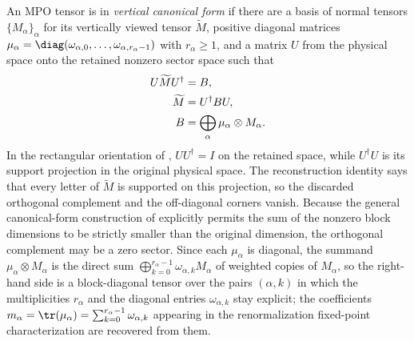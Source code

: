 \begin{definition}\label{def:vertical_cf_mpdo}
    \leanok
    An MPO tensor is in \emph{vertical canonical form} if there are a basis of
    normal tensors $\{M_\alpha\}_\alpha$ for its vertically viewed tensor
    $\widetilde M$, positive diagonal matrices
    $\mu_\alpha=\diag(\omega_{\alpha,0},\ldots,\omega_{\alpha,r_\alpha-1})$
    with $r_\alpha\geq1$,
    and a matrix $U$ from the physical space onto the retained nonzero sector
    space such that
    \begin{align}
        U\widetilde MU^\dagger
         & =B,
        \notag                                           \\
        \widetilde M
         & =U^\dagger B U,
        \notag                                           \\
        B
         & =\bigoplus_\alpha \mu_\alpha\otimes M_\alpha.
        \label{eq:mpdo_vertical_cf}
    \end{align}
    In the rectangular orientation of
    \cite[Proposition~4.13, lines~1863--1870]{Cirac2016MPDO_arXiv},
    $UU^\dagger=I$ on the retained space, while
    $U^\dagger U$ is its support projection in the original physical space.
    The reconstruction identity says that every letter of $\widetilde M$ is
    supported on this projection, so the discarded orthogonal complement and
    the off-diagonal corners vanish.
    Because the general canonical-form construction of
    \cite[lines~214--225]{Cirac2016MPDO_arXiv} explicitly permits the sum of the
    nonzero block dimensions to be strictly smaller than the original dimension,
    the orthogonal complement may be a zero sector.
    Since each $\mu_\alpha$ is diagonal, the summand
    $\mu_\alpha\otimes M_\alpha$ is the direct sum
    $\bigoplus_{k=0}^{r_\alpha-1}\omega_{\alpha,k}M_\alpha$ of weighted copies
    of $M_\alpha$, so the right-hand side is a block-diagonal tensor over the
    pairs $(\alpha,k)$ in which the multiplicities $r_\alpha$ and the diagonal
    entries $\omega_{\alpha,k}$ stay explicit; the coefficients
    $m_\alpha=\tr(\mu_\alpha)=\sum_{k=0}^{r_\alpha-1}\omega_{\alpha,k}$
    appearing in the renormalization fixed-point characterization are
    recovered from them.
\end{definition}

